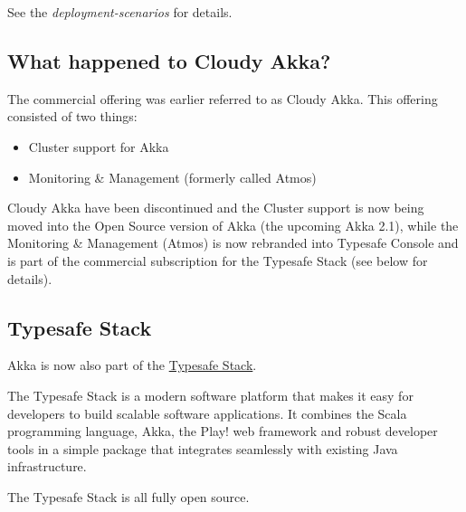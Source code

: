 \documentclass[a4paper,10pt,oneside,openany]{sphinxmanual}
\begin{document}
See the \emph{deployment-scenarios} for details.


\subsection{What happened to Cloudy Akka?}
\label{intro/what-is-scala-words:what-happened-to-cloudy-akka}
The commercial offering was earlier referred to as Cloudy Akka. This offering
consisted of two things:
\begin{itemize}
\item {} 
Cluster support for Akka

\item {} 
Monitoring \& Management (formerly called Atmos)

\end{itemize}

Cloudy Akka have been discontinued and the Cluster support is now being moved into the
Open Source version of Akka (the upcoming Akka 2.1), while the Monitoring \& Management
(Atmos) is now rebranded into Typesafe Console and is part of the commercial subscription
for the Typesafe Stack (see below for details).


\subsection{Typesafe Stack}
\label{intro/what-is-scala-words:typesafe-stack}
Akka is now also part of the \href{http://typesafe.com/stack}{Typesafe Stack}.

The Typesafe Stack is a modern software platform that makes it easy for developers
to build scalable software applications. It combines the Scala programming language,
Akka, the Play! web framework and robust developer tools in a simple package that
integrates seamlessly with existing Java infrastructure.

The Typesafe Stack is all fully open source.
\end{document}
